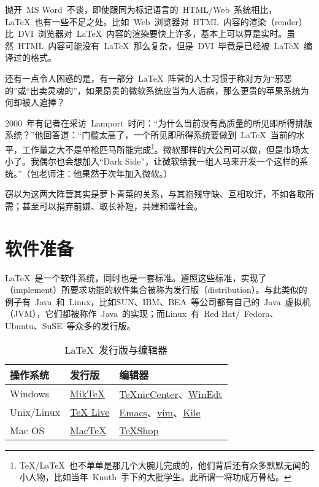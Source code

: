 抛开~MS Word~不谈，即使跟同为标记语言的~HTML/Web~系统相比，\LaTeX~也有一些不足之处。比如~Web~浏览器对~HTML~内容的渲染（render）比~DVI~浏览器对~\LaTeX~内容的渲染要快上许多，基本上可以算是实时。虽然~HTML~内容可能没有~LaTeX~那么复杂，但是~DVI~毕竟是已经被~\LaTeX~编译过的格式。

还有一点令人困惑的是，有一部分~\LaTeX~阵营的人士习惯于称对方为“邪恶的”或“出卖灵魂的”，如果昂贵的微软系统应当为人诟病，那么更贵的苹果系统为何却被人追捧？

2000~年有记者在采访~Lamport~时问：“为什么当前没有高质量的所见即所得排版系统？”他回答道：“门槛太高了，一个所见即所得系统要做到~\LaTeX~当前的水平，工作量之大不是单枪匹马所能完成\footnote{\TeX/\LaTeX~也不单单是那几个大腕儿完成的，他们背后还有众多默默无闻的小人物，比如当年~Knuth~手下的大批学生。此所谓一将功成万骨枯。}。微软那样的大公司可以做，但是市场太小了。我偶尔也会想加入“Dark Side”，让微软给我一组人马来开发一个这样的系统。”（包老师注：他果然于次年加入微软。）

窃以为这两大阵营其实是萝卜青菜的关系，与其抱残守缺、互相攻讦，不如各取所需；甚至可以捐弃前嫌、取长补短，共建和谐社会。

\section{软件准备}
\label{sec:latexsoft}

\LaTeX~是一个软件系统，同时也是一套标准。遵照这些标准，实现了（implement）所要求功能的软件集合被称为发行版（distribution）。与此类似的例子有~Java~和~Linux，比如SUN、IBM、BEA~等公司都有自己的~Java~虚拟机（JVM），它们都被称作~Java~的实现；而Linux~有~Red Hat/~Fedora、Ubuntu、SuSE~等众多的发行版。

\begin{table}[htbp]
\caption{\LaTeX~发行版与编辑器}
\label{tab:latexsoft}
\centering
\begin{tabular}{lll}
    \toprule
    操作系统 & 发行版 & 编辑器 \\
    \midrule
    Windows & \href{http://www.miktex.org/}{MikTeX} & \href{http://www.toolscenter.org/}{TeXnicCenter}、\href{http://www.winedt.com/}{WinEdt} \\
    Unix/Linux & \href{http://www.tug.org/texlive/}{TeX Live} & \href{http://www.gnu.org/software/emacs/emacs.html}{Emacs}、\href{http://vim.sourceforge.net/}{vim}、\href{http://kile.sourceforge.net/}{Kile} \\
    Mac OS & \href{http://www.tug.org/mactex/}{MacTeX} & \href{http://www.uoregon.edu/~koch/texshop/}{TeXShop} \\
    \bottomrule
\end{tabular}
\end{table}

